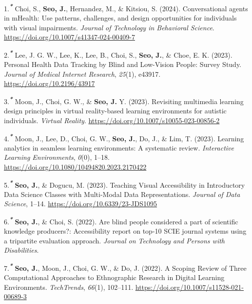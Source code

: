 \documentclass[11pt,a4paper,]{awesome-cv}
\newlength{\cslhangindent}
\newenvironment{CSLReferences}[2] %
 {\begin{list}{}{%
  \setlength{\itemindent}{0pt}
  \setlength{\leftmargin}{0pt}
  \setlength{\parsep}{0pt}
  \ifodd #1
   \setlength{\leftmargin}{\cslhangindent}
   \setlength{\itemindent}{-1\cslhangindent}
  \fi
  \setlength{\itemsep}{#2\baselineskip}}}
 {\end{list}}
\begin{document}
\label{refs-d6b059466fc312a74a014e8d2d46e645}
\begin{CSLReferences}{1}{0}
1.\textsuperscript{\textbf{\emph{*}}} Choi, S., \textbf{Seo, J.},
Hernandez, M., \& Kitsiou, S. (2024). Conversational agents in mHealth:
Use patterns, challenges, and design opportunities for individuals with
visual impairments. \emph{Journal of Technology in Behavioral Science}.
\url{https://doi.org/10.1007/s41347-024-00409-7}

2.\textsuperscript{\textbf{\emph{*}}} Lee, J. G. W., Lee, K., Lee, B.,
Choi, S., \textbf{Seo, J.}, \& Choe, E. K. (2023). Personal Health Data
Tracking by Blind and Low-Vision People: Survey Study. \emph{Journal of
Medical Internet Research}, \emph{25}(1), e43917.
\url{https://doi.org/10.2196/43917}

3.\textsuperscript{\textbf{\emph{*}}} Moon, J., Choi, G. W., \&
\textbf{Seo, J.} Y. (2023). Revisiting multimedia learning design
principles in virtual reality-based learning environments for autistic
individuals. \emph{Virtual Reality}.
\url{https://doi.org/10.1007/s10055-023-00856-2}

4.\textsuperscript{\textbf{\emph{*}}} Moon, J., Lee, D., Choi, G. W.,
\textbf{Seo, J.}, Do, J., \& Lim, T. (2023). Learning analytics in
seamless learning environments: A systematic review. \emph{Interactive
Learning Environments}, \emph{0}(0), 1--18.
\url{https://doi.org/10.1080/10494820.2023.2170422}

5.\textsuperscript{\textbf{\emph{*}}} \textbf{Seo, J.}, \& Dogucu, M.
(2023). Teaching Visual Accessibility in Introductory Data Science
Classes with Multi-Modal Data Representations. \emph{Journal of Data
Science}, 1--14. \url{https://doi.org/10.6339/23-JDS1095}

6.\textsuperscript{\textbf{\emph{*}}} \textbf{Seo, J.}, \& Choi, S.
(2022). Are blind people considered a part of scientific knowledge
producers?: Accessibility report on top-10 SCIE journal systems using a
tripartite evaluation approach. \emph{Journal on Technology and Persons
with Disabilities}.

7.\textsuperscript{\textbf{\emph{*}}} \textbf{Seo, J.}, Moon, J., Choi,
G. W., \& Do, J. (2022). A Scoping Review of Three Computational
Approaches to Ethnographic Research in Digital Learning Environments.
\emph{TechTrends}, \emph{66}(1), 102--111.
\url{https://doi.org/10.1007/s11528-021-00689-3}


\end{CSLReferences}
\end{document}
